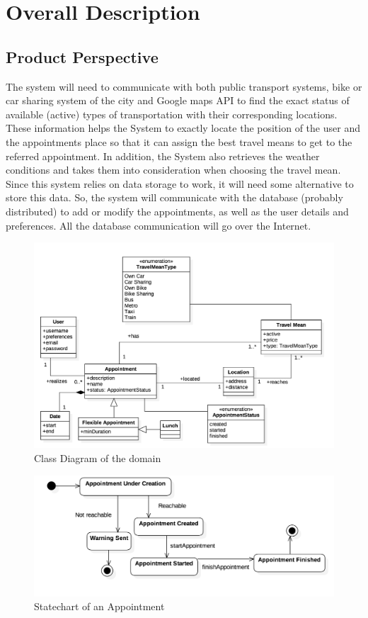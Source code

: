 \documentclass[12pt]{article}
\begin{document}
\section{Overall Description}

\subsection{Product Perspective}
The system will need to communicate with both public transport systems, bike or car sharing system of the city and Google maps API to find the exact status of available (active) types of transportation with their corresponding locations. These information helps the System to exactly locate the position of the user and the appointments place so that it can assign the best travel means to get to the referred appointment. In addition, the System also retrieves the weather conditions and takes them into consideration when choosing the travel mean.
Since this system relies on data storage to work, it will need some alternative to store this data. So, the system will communicate with the database (probably distributed) to add or modify the appointments, as well as the user details and preferences. All the database communication will go over the Internet.
    \begin{figure}[H]
        \includegraphics[scale=0.3]{domainModel.png}
        \caption{Class Diagram of the domain}
        \centering
    \label{fig:domainModel}
    \end{figure}
    \begin{figure}[H]
    \centering
        \includegraphics[scale=0.33]{statechartAppointment.png}
        \caption{Statechart of an Appointment}
    \label{fig:domainModel}
    \end{figure}
    
\end{document}

